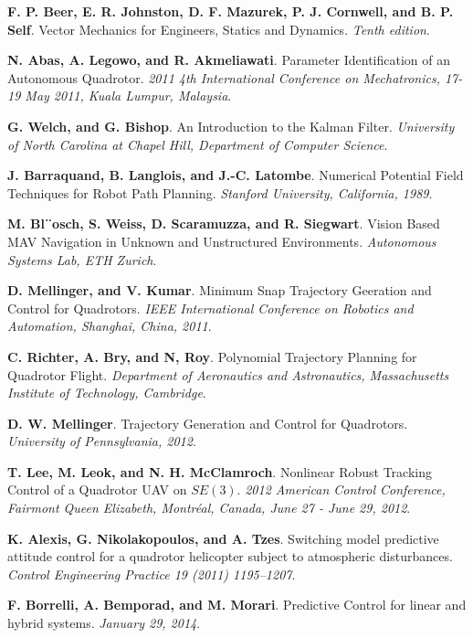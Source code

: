 \documentclass[11pt, a4paper, onecolumn, fleqn, twoside, titlepage, openright]{book}
\begin{document}
\begin{thebibliography}{1}
		\textbf{F. P. Beer, E. R. Johnston, D. F. Mazurek, P. J. Cornwell, and B. P. Self}.
		Vector Mechanics for Engineers, Statics and Dynamics.
		\textit{Tenth edition}.

		\textbf{N. Abas, A. Legowo, and R. Akmeliawati}.
		Parameter Identification of an Autonomous Quadrotor.
		\textit{2011 4th International Conference on Mechatronics, 17-19 May 2011, Kuala Lumpur, Malaysia}.

		\textbf{G. Welch, and G. Bishop}.
		An Introduction to the Kalman Filter.
		\textit{University of North Carolina at Chapel Hill, Department of Computer Science}.

		\textbf{J. Barraquand, B. Langlois, and J.-C. Latombe}.
		Numerical Potential Field Techniques for Robot Path Planning.
		\textit{Stanford University, California, 1989}.

		\textbf{M. Bl¨osch, S. Weiss, D. Scaramuzza, and R. Siegwart}.
		Vision Based MAV Navigation in Unknown and Unstructured Environments.
		\textit{Autonomous Systems Lab, ETH Zurich}.

		\textbf{D. Mellinger, and V. Kumar}.
		Minimum Snap Trajectory Geeration and Control for Quadrotors.
		\textit{IEEE International Conference on Robotics and Automation, Shanghai, China, 2011}.

		\textbf{C. Richter, A. Bry, and N, Roy}.
		Polynomial Trajectory Planning for Quadrotor Flight.
		\textit{Department of Aeronautics and Astronautics, Massachusetts Institute of Technology, Cambridge}.

		\textbf{D. W. Mellinger}.
		Trajectory Generation and Control for Quadrotors.
		\textit{University of Pennsylvania, 2012}.

		\textbf{T. Lee, M. Leok, and N. H. McClamroch}.
		Nonlinear Robust Tracking Control of a Quadrotor UAV on $SE(3)$.
		\textit{2012 American Control Conference, Fairmont Queen Elizabeth, Montréal, Canada, June 27 - June 29, 2012}.		

		\textbf{K. Alexis, G. Nikolakopoulos, and A. Tzes}.
		Switching model predictive attitude control for a quadrotor helicopter subject to atmospheric disturbances.
		\textit{Control Engineering Practice 19 (2011) 1195–1207}.

		\textbf{F. Borrelli, A. Bemporad, and M. Morari}.
		Predictive Control for linear and hybrid systems.
		\textit{January 29, 2014}.

	\end{thebibliography}
\end{document}
